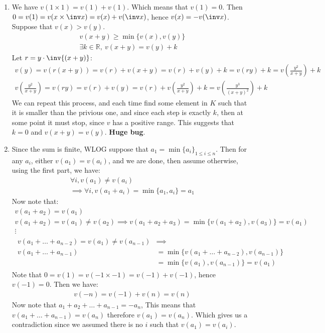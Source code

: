 \begin{enumerate}[label=\ilabel]
    \item 
        We have $v(1 \times 1) = v(1) + v(1)$. Which means that $v(1) = 0$.
        Then $0 = v(1) = v(x \times \inv x) = v(x) + v(\inv x)$, hence $v(x) = - v(\inv x)$.
        Suppose that $v(x) > v(y)$. 
        \begin{gather*}
            v(x + y) \ge \min \{v(x), v(y)\} \\
            \exists k \in \mathbb R, \ v(x + y) = v(y) + k
        \end{gather*}
        Let $r = y \cdot \inv{(x + y)}$:
        \begin{gather*}
            v(y) = v(r (x + y)) = v(r) + v(x + y) = v(r) + v(y) + k = v(ry) + k = v(\frac{y^2}{x + y}) + k \\
            v(\frac{y^2}{x + y}) = v(ry) = v(r) + v(y) = v(r) + v(\frac{y^2}{x + y}) + k = v(\frac{y^3}{(x + y)^2}) + k
        \end{gather*}
        We can repeat this process, and each time find some element in $K$ such that it is smaller than the privious one, and since each step is exactly $k$, then at some point it must stop, since $v$ has a positive range. This suggests that $k = 0$ and $v(x + y) = v(y)$. \textbf{Huge bug}.

    \item 
        Since the sum is finite, WLOG suppose that $a_1 = \min \{a_i\}_{1 \le i \le n}$. Then for any $a_i$, either $v(a_1) = v(a_i)$, and we are done, then assume otherwise, using the first part, we have:
        \begin{gather*}
            \forall i, v(a_1) \ne v(a_i) \\
            \implies \forall i, v(a_1 + a_i) = \min \{a_1, a_i \} = a_1
        \end{gather*}
        Now note that:
        \begin{gather*}
            v(a_1 + a_2) = v(a_1) \\
            v(a_1 + a_2) = v(a_1) \ne v(a_2) \implies v(a_1 + a_2 + a_3) = \min \{ v(a_1 + a_2), v(a_3) \} = v(a_1) \\
            \vdots \\
            \begin{split}
                v(a_1 + \dots + a_{n - 2}) = v(a_1) \ne v(a_{n - 1}) & \implies \\
                v(a_1 + \dots + a_{n - 1}) & = \min \{ v(a_1 + \dots + a_{n - 2}), v(a_{n - 1}) \} \\
                & = \min \{v(a_1) , v(a_{n - 1}) \} = v(a_1)
            \end{split}
        \end{gather*}
        Note that $0 = v(1) = v(-1 \times -1) = v(-1) + v(-1)$, hence $v(-1) = 0$. Then we have:
        \begin{gather*}
            v(-n) = v(-1) + v(n) = v(n)
        \end{gather*}
        Now note that $a_1 + a_2 + \dots + a_{n - 1} = - a_n$, This means that $v(a_1 + \dots + a_{n - 1}) = v(a_n)$ therefore $v(a_1) = v(a_n)$. Which gives us a contradiction since we assumed there is no $i$ such that $v(a_1) = v(a_i)$. 
\end{enumerate}